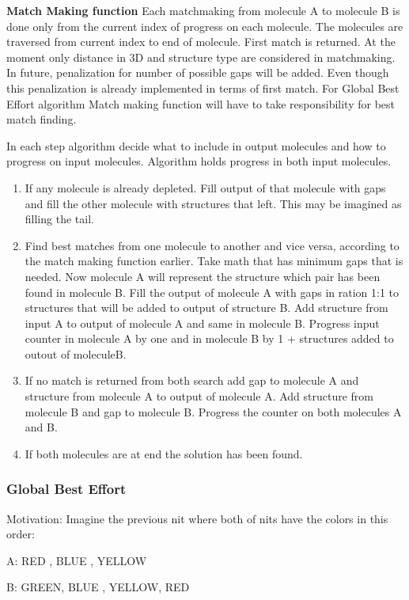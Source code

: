 \documentclass[twocolumn]{bmcart}%
\begin{document}
\textbf{Match Making function}
Each matchmaking from molecule A to molecule B is done only from the current index of progress on each molecule. 
The molecules are traversed from current index to end of molecule. 
First match is returned. 
At the moment only distance in 3D and structure type are considered in matchmaking. 
In future, penalization for number of possible gaps will be added. 
Even though this penalization is already implemented in terms of first match. 
For Global Best Effort algorithm Match making function will have to take responsibility for best match finding.

In each step algorithm decide what to include in output molecules and how to progress on input molecules. 
Algorithm holds progress in both input molecules.

\begin{enumerate}
	\item 
	If any molecule is already depleted. 
	Fill output of that molecule with gaps and fill the other molecule with structures that left. 
	This may be imagined as filling the tail.
	\item  
	Find best matches from one molecule to another and vice versa, according to the match making function earlier. 
	Take math that has minimum gaps that is needed. 
	Now molecule A will represent the structure which pair has been found in molecule B. 
	Fill the output of molecule A with gaps in ration 1:1 to structures that will be added to output of structure B. 
	Add structure from input A to output of molecule A and same in molecule B. 
	Progress input counter in molecule A by one and in molecule B by 1 + structures added to outout of moleculeB.   
  \item If no match is returned from both search add gap to molecule A and structure from molecule A to output of molecule A. 
	Add structure from molecule B and gap to molecule B. 
	Progress the counter on both molecules A and B.
	\item If both molecules are at end the solution has been found.
\end{enumerate}

\subsubsection{Global Best Effort}
Motivation:
Imagine the previous nit where both of nits have the colors in this order:
 
A: RED  , BLUE , YELLOW

B: GREEN, BLUE , YELLOW, RED
\end{document}

